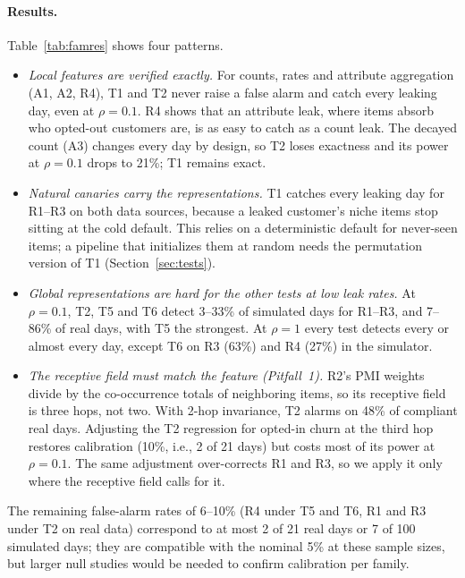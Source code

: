 \documentclass[10pt,twocolumn,letterpaper]{article}
\theoremstyle{definition}
\begin{document}
\paragraph{Results.}
Table~\ref{tab:famres} shows four patterns.
\begin{itemize}
  \item \emph{Local features are verified exactly.} For counts, rates and
        attribute aggregation (A1, A2, R4), T1 and T2 never raise a false
        alarm and catch every leaking day, even at $\rho=0.1$. R4 shows that
        an attribute leak, where items absorb who opted-out customers are, is
        as easy to catch as a count leak. The decayed count (A3) changes every
        day by design, so T2 loses exactness and its power at $\rho=0.1$ drops
        to 21\%; T1 remains exact.
  \item \emph{Natural canaries carry the representations.} T1 catches every
        leaking day for R1--R3 on both data sources, because a leaked
        customer's niche items stop sitting at the cold default. This relies
        on a deterministic default for never-seen items; a pipeline that
        initializes them at random needs the permutation version of T1
        (Section~\ref{sec:tests}).
  \item \emph{Global representations are hard for the other tests at low leak
        rates.} At $\rho=0.1$, T2, T5 and T6 detect 3--33\% of simulated days
        for R1--R3, and 7--86\% of real days, with T5 the strongest. At
        $\rho=1$ every test detects every or almost every day, except T6 on R3
        (63\%) and R4 (27\%) in the simulator.
  \item \emph{The receptive field must match the feature (Pitfall~1).} R2's
        PMI weights divide by the co-occurrence totals of neighboring items,
        so its receptive field is three hops, not two. With 2-hop invariance,
        T2 alarms on 48\% of compliant real days. Adjusting the T2 regression
        for opted-in churn at the third hop restores calibration (10\%, i.e.,
        2 of 21 days) but costs most of its power at $\rho=0.1$. The same
        adjustment over-corrects R1 and R3, so we apply it only where the
        receptive field calls for it.
\end{itemize}
The remaining false-alarm rates of 6--10\% (R4 under T5 and T6, R1 and R3
under T2 on real data) correspond to at most 2 of 21 real days or 7 of 100
simulated days; they are compatible with the nominal 5\% at these sample
sizes, but larger null studies would be needed to confirm calibration per
family.
\end{document}
